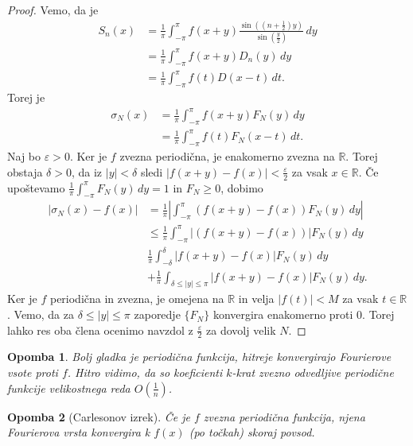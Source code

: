 \documentclass[10pt, a4paper]{article}
\newtheorem*{opomba}{Opomba}
\newenvironment{noticeC}{%
  \tcolorbox[%
  notitle,
  empty,
  enhanced,  %
  breakable,
  coltext=black, 
  fontupper=\rmfamily,
  parbox=false,
  noparskip,
  sharp corners,
  boxrule=-1pt,  %
  frame hidden,
  left=7pt,  %
  right=7pt,
  top=5pt,
  bottom=5pt,
  before skip=2.5ex plus 2pt,
  after skip=2.5ex plus 2pt,
  overlay unbroken and last={%
  },
  ]}
{\endtcolorbox}
\newenvironment{dokaz}%
  {\begin{noticeC}\begin{proof}}%
  {\end{proof}\end{noticeC}}
\newcommand{\R}{\mathbb {R}}
\begin{document}
\begin{dokaz}
    Vemo, da je 
    \begin{align*}
        S_n (x) &= \frac{1}{\pi} \int_{-\pi} ^\pi f(x + y) \frac{\sin\left(\left(n + \frac{1}{2}\right)y\right)}{\sin \left(\frac{y}{2}\right)}\, dy\\
        &= \frac{1}{\pi} \int_{-\pi} ^\pi f(x + y) D_n (y)\, dy\\
        &= \frac{1}{\pi} \int_{-\pi} ^\pi f(t) D(x - t)\, dt.
    \end{align*}
    Torej je 
    \begin{align*}
        \sigma_N (x) &= \frac{1}{\pi} \int_{-\pi} ^\pi f(x + y) F_N (y)\, dy\\
        &= \frac{1}{\pi} \int_{-\pi} ^\pi f(t) F_N (x - t)\, dt.
    \end{align*}
    Naj bo $\varepsilon > 0$. Ker je $f$ zvezna periodična, je enakomerno zvezna na $\R$.
    Torej obstaja $\delta > 0$, da iz $|y| < \delta$ sledi 
    $|f(x + y) - f(x)| <\frac{\varepsilon}{2}$ za vsak $x \in \R$.
    Če upoštevamo $\frac{1}{\pi} \int_{-\pi} ^\pi F_N(y)\, dy = 1$ in $F_N \geq 0$,
    dobimo 
    \begin{align*}
        |\sigma_N (x) - f(x)| &= \frac{1}{\pi} \left| \int_{-\pi} ^\pi (f(x + y) - f(x)) F_N (y)\, dy \right|\\
        &\leq \frac{1}{\pi} \int_{-\pi} ^\pi \left| (f(x + y) - f(x)) \right| F_N (y)\, dy\\
        &\frac{1}{\pi} \int_{-\delta} ^\delta |f(x+y) - f(x)| F_N (y)\, dy \\
        &+\frac{1}{\pi} \int_{\delta \leq |y| \leq \pi} |f(x+y) - f(x)| F_N (y)\, dy.
    \end{align*}
    Ker je $f$ periodična in zvezna, je omejena na $\R$ in velja 
    $|f(t)| < M$ za vsak $t \in \R$. Vemo, da za $\delta \leq |y| \leq \pi$
    zaporedje $\{F_N\}$ konvergira enakomerno proti $0$. Torej lahko res oba člena ocenimo navzdol z
    $\frac{\varepsilon}{2}$ za dovolj velik $N$.
\end{dokaz}

\begin{opomba}
    Bolj gladka je periodična funkcija, hitreje konvergirajo Fourierove vsote proti $f$.
    Hitro vidimo, da so koeficienti $k$-krat zvezno odvedljive periodične funkcije velikostnega reda $O\left(\frac{1}{n} \right)$. 
\end{opomba}

\begin{opomba}[Carlesonov izrek]
    Če je $f$ zvezna periodična funkcija, njena Fourierova vrsta konvergira k $f(x)$
    (po točkah) skoraj povsod.
\end{opomba}
\end{document}
